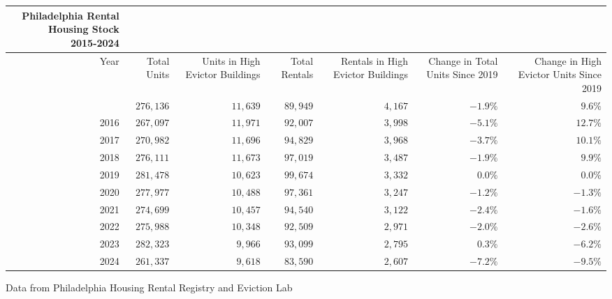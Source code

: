 \setlength{\LTpost}{0mm}
\begin{longtable}{rrrrrrr}
\caption*{
{\large Philadelphia Rental Housing Stock} \\ 
{\small 2015-2024}
} \\ 
\toprule
Year & Total Units & Units in High Evictor Buildings & Total Rentals & Rentals in High Evictor Buildings & Change in Total Units Since 2019 & Change in High Evictor Units Since 2019 \\ 
\midrule\addlinespace[2.5pt]
2015 & $276,136$ & $11,639$ & $89,949$ & $4,167$ & $-1.9\%$ & $9.6\%$ \\ 
2016 & $267,097$ & $11,971$ & $92,007$ & $3,998$ & $-5.1\%$ & $12.7\%$ \\ 
2017 & $270,982$ & $11,696$ & $94,829$ & $3,968$ & $-3.7\%$ & $10.1\%$ \\ 
2018 & $276,111$ & $11,673$ & $97,019$ & $3,487$ & $-1.9\%$ & $9.9\%$ \\ 
2019 & $281,478$ & $10,623$ & $99,674$ & $3,332$ & $0.0\%$ & $0.0\%$ \\ 
2020 & $277,977$ & $10,488$ & $97,361$ & $3,247$ & $-1.2\%$ & $-1.3\%$ \\ 
2021 & $274,699$ & $10,457$ & $94,540$ & $3,122$ & $-2.4\%$ & $-1.6\%$ \\ 
2022 & $275,988$ & $10,348$ & $92,509$ & $2,971$ & $-2.0\%$ & $-2.6\%$ \\ 
2023 & $282,323$ & $9,966$ & $93,099$ & $2,795$ & $0.3\%$ & $-6.2\%$ \\ 
2024 & $261,337$ & $9,618$ & $83,590$ & $2,607$ & $-7.2\%$ & $-9.5\%$ \\ 
\bottomrule
\end{longtable}
\begin{minipage}{\linewidth}
Data from Philadelphia Housing Rental Registry and Eviction Lab\\
\end{minipage}

